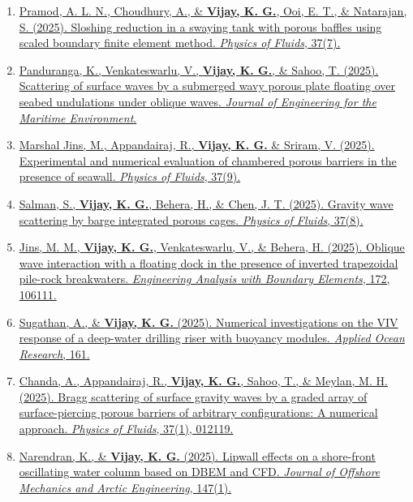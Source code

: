 \begin{enumerate}[label=\protect\circled{\arabic*}]
\item \href{https://doi.org/10.1063/5.0270425}{%
Pramod, A. L. N., Choudhury, A., \& \textbf{Vijay, K. G.}, Ooi, E. T., \& Natarajan, S. (2025). Sloshing reduction in a swaying tank with porous baffles using scaled boundary finite element method. \textit{Physics of Fluids}, 37(7).}

\item \href{https://doi.org/10.1177/14750902251329077}{%
Panduranga, K., Venkateswarlu, V., \textbf{Vijay, K. G.}, \& Sahoo, T. (2025). Scattering of surface waves by a submerged wavy porous plate floating over seabed undulations under oblique waves. \textit{Journal of Engineering for the Maritime Environment}.}

\item \href{https://doi.org/10.1063/5.0284532}{%
Marshal Jins, M., Appandairaj, R., \textbf{Vijay, K. G.} \& Sriram, V. (2025). Experimental and numerical evaluation of chambered porous barriers in the presence of seawall. \textit{Physics of Fluids}, 37(9).}

\item \href{https://doi.org/10.1063/5.0278863}{%
Salman, S., \textbf{Vijay, K. G.}, Behera, H., \& Chen, J. T. (2025). Gravity wave scattering by barge integrated porous cages. \textit{Physics of Fluids}, 37(8).}

\item \href{https://doi.org/10.1016/j.enganabound.2024.106111}{%
Jins, M. M., \textbf{Vijay, K. G.}, Venkateswarlu, V., \& Behera, H. (2025). Oblique wave interaction with a floating dock in the presence of inverted trapezoidal pile-rock breakwaters. \textit{Engineering Analysis with Boundary Elements}, 172, 106111.}

\item \href{https://doi.org/10.1016/j.apor.2025.104650}{%
Sugathan, A., \& \textbf{Vijay, K. G.} (2025). Numerical investigations on the VIV response of a deep-water drilling riser with buoyancy modules. \textit{Applied Ocean Research}, 161.}

\item \href{https://doi.org/10.1063/5.0234244}{%
Chanda, A., Appandairaj, R., \textbf{Vijay, K. G.}, Sahoo, T., \& Meylan, M. H. (2025). Bragg scattering of surface gravity waves by a graded array of surface-piercing porous barriers of arbitrary configurations: A numerical approach. \textit{Physics of Fluids}, 37(1), 012119.}

\item \href{https://doi.org/10.1115/1.4064616}{%
Narendran, K., \& \textbf{Vijay, K. G.} (2025). Lipwall effects on a shore-front oscillating water column based on DBEM and CFD. \textit{Journal of Offshore Mechanics and Arctic Engineering}, 147(1).}


\end{enumerate}
